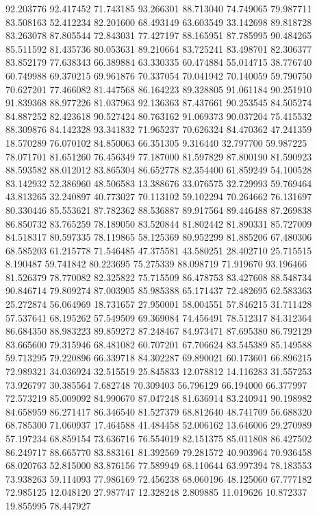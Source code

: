 92.203776
92.417452
71.743185
93.266301
88.713040
74.749065
79.987711
83.508163
52.412234
82.201600
68.493149
63.603549
33.142698
89.818728
83.263078
87.805544
72.843031
77.427197
88.165951
87.785995
90.484265
85.511592
81.435736
80.053631
89.210664
83.725241
83.498701
82.306377
83.852179
77.638343
66.389884
63.330335
60.474884
55.014715
38.776740
60.749988
69.370215
69.961876
70.337054
70.041942
70.140059
59.790750
70.627201
77.466082
81.447568
86.164223
89.328805
91.061184
90.251910
91.839368
88.977226
81.037963
92.136363
87.437661
90.253545
84.505274
84.887252
82.423618
90.527424
80.763162
91.069373
90.037204
75.415532
88.309876
84.142328
93.341832
71.965237
70.626324
84.470362
47.241359
18.570289
76.070102
84.850063
66.351305
9.316440
32.797700
59.987225
78.071701
81.651260
76.456349
77.187000
81.597829
87.800190
81.590923
88.593582
88.012012
83.865304
86.652778
82.354400
61.859249
54.100528
83.142932
52.386960
48.506583
13.388676
33.076575
32.729993
59.769464
43.813265
32.240897
40.773027
70.113102
59.102294
70.264662
76.131697
80.330446
85.553621
87.782362
88.536887
89.917564
89.446488
87.269838
86.850732
83.765259
78.189050
83.520844
81.802442
81.890331
85.727009
84.518317
80.597335
78.119865
58.125369
80.952299
81.885206
67.480306
68.585203
61.215778
71.546485
47.375581
43.580251
28.402710
25.715515
8.190487
59.741842
80.223695
75.275339
88.098719
71.919670
93.196466
81.526379
78.770082
82.325822
75.715509
86.478753
83.427608
88.548734
90.846714
79.809274
87.003905
85.985388
65.171437
72.482695
62.583363
25.272874
56.064969
18.731657
27.950001
58.004551
57.846215
31.711428
57.537641
68.195262
57.549509
69.369084
74.456491
78.512317
84.312364
86.684350
88.983223
89.859272
87.248467
84.973471
87.695380
86.792129
83.665600
79.315946
68.481082
60.707201
67.706624
83.545389
85.149588
59.713295
79.220896
66.339718
84.302287
69.890021
60.173601
66.896215
72.989321
34.036924
32.515519
25.845833
12.078812
14.116283
31.557253
73.926797
30.385564
7.682748
70.309403
56.796129
66.194000
66.377997
72.573219
85.009092
84.990670
87.047248
81.636914
83.240941
90.198982
84.658959
86.271417
86.346540
81.527379
68.812640
48.741709
56.688320
68.785300
71.060937
17.464588
41.484458
52.006162
13.646006
29.270989
57.197234
68.859154
73.636716
76.554019
82.151375
85.011808
86.427502
86.249717
88.665770
83.883161
81.392569
79.281572
40.903964
70.936458
68.020763
52.815000
83.876156
77.589949
68.110644
63.997394
78.183553
73.938263
59.114093
77.986169
72.456238
68.060196
48.125060
67.777182
72.985125
12.048120
27.987747
12.328248
2.809885
11.019626
10.872337
19.855995
78.447927
